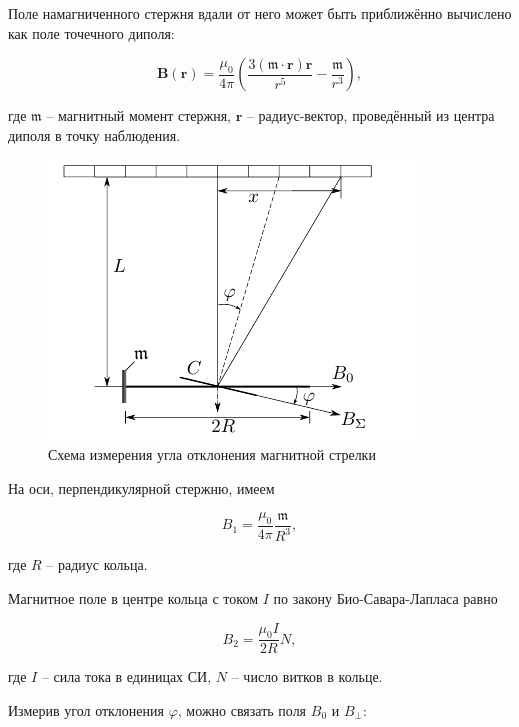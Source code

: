 \documentclass[a4paper, 12pt]{article}
\begin{document}
    Поле намагниченного стержня вдали от него может быть приближённо вычислено как поле точечного диполя:

    \begin{equation}
        \bm{B}(\bm{r}) = \frac{\mu_0}{4\pi} \left( \frac{3(\bm{\mathfrak{m}} \cdot \bm{r}) \bm{r}}{r^5} - \frac{\bm{\mathfrak{m}}}{r^3} \right),
    \end{equation}

    где $\bm{\mathfrak{m}}$ -- магнитный момент стержня, $\bm{r}$ -- радиус-вектор, проведённый из центра диполя в точку наблюдения. 

    \begin{figure}[H]
        \centering
        \includegraphics{images/installation.png}
        \caption{Схема измерения угла отклонения магнитной стрелки}
        \label{installation}
    \end{figure}
    
    На оси, перпендикулярной стержню, имеем

    \begin{equation}
        B_1 = \frac{\mu_0}{4\pi} \frac{\mathfrak{m}}{R^3},
        \label{eq:dipole_field}
    \end{equation}

    где $R$ -- радиус кольца.

    Магнитное поле в центре кольца с током $I$ по закону Био-Савара-Лапласа равно

    \begin{equation}
        B_2 = \frac{\mu_0 I}{2R}N,
        \label{eq:ring_current}
    \end{equation}

    где $I$ -- сила тока в единицах СИ, $N$ -- число витков в кольце.

    Измерив угол отклонения $\varphi$, можно связать поля $B_0$ и $B_\perp$:
\end{document}
